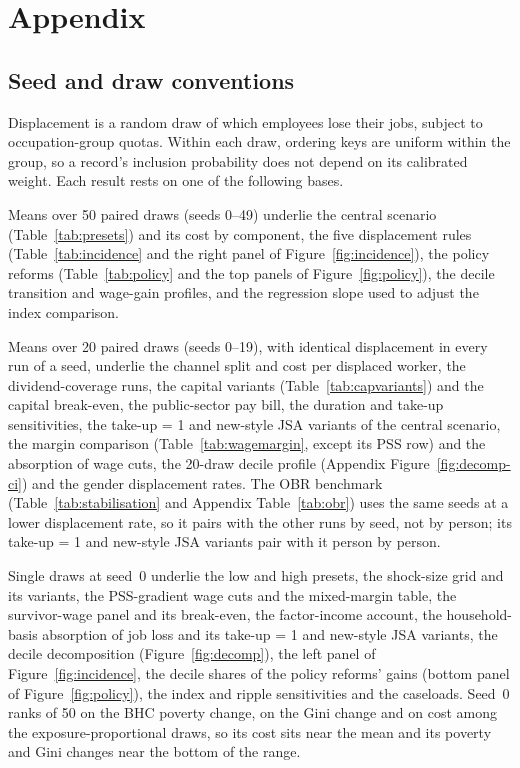 \appendix
\section{Appendix}
\label{sec:appendix}

\subsection{Seed and draw conventions}
\label{app:seeds}

Displacement is a random draw of which employees lose their jobs, subject to occupation-group quotas. Within each draw, ordering keys are uniform within the group, so a record's inclusion probability does not depend on its calibrated weight. Each result rests on one of the following bases.

Means over 50 paired draws (seeds 0--49) underlie the central scenario (Table~\ref{tab:presets}) and its cost by component, the five displacement rules (Table~\ref{tab:incidence} and the right panel of Figure~\ref{fig:incidence}), the policy reforms (Table~\ref{tab:policy} and the top panels of Figure~\ref{fig:policy}), the decile transition and wage-gain profiles, and the regression slope used to adjust the index comparison.

Means over 20 paired draws (seeds 0--19), with identical displacement in every run of a seed, underlie the channel split and cost per displaced worker, the dividend-coverage runs, the capital variants (Table~\ref{tab:capvariants}) and the capital break-even, the public-sector pay bill, the duration and take-up sensitivities, the take-up = 1 and new-style JSA variants of the central scenario, the margin comparison (Table~\ref{tab:wagemargin}, except its PSS row) and the absorption of wage cuts, the 20-draw decile profile (Appendix Figure~\ref{fig:decomp-ci}) and the gender displacement rates. The OBR benchmark (Table~\ref{tab:stabilisation} and Appendix Table~\ref{tab:obr}) uses the same seeds at a lower displacement rate, so it pairs with the other runs by seed, not by person; its take-up = 1 and new-style JSA variants pair with it person by person.

Single draws at seed~0 underlie the low and high presets, the shock-size grid and its variants, the PSS-gradient wage cuts and the mixed-margin table, the survivor-wage panel and its break-even, the factor-income account, the household-basis absorption of job loss and its take-up = 1 and new-style JSA variants, the decile decomposition (Figure~\ref{fig:decomp}), the left panel of Figure~\ref{fig:incidence}, the decile shares of the policy reforms' gains (bottom panel of Figure~\ref{fig:policy}), the index and ripple sensitivities and the caseloads. Seed~0 ranks \genSeedZeroRankPovBhc{} of 50 on the BHC poverty change, \genSeedZeroRankGini{} on the Gini change and \genSeedZeroRankCost{} on cost among the exposure-proportional draws, so its cost sits near the mean and its poverty and Gini changes near the bottom of the range.


